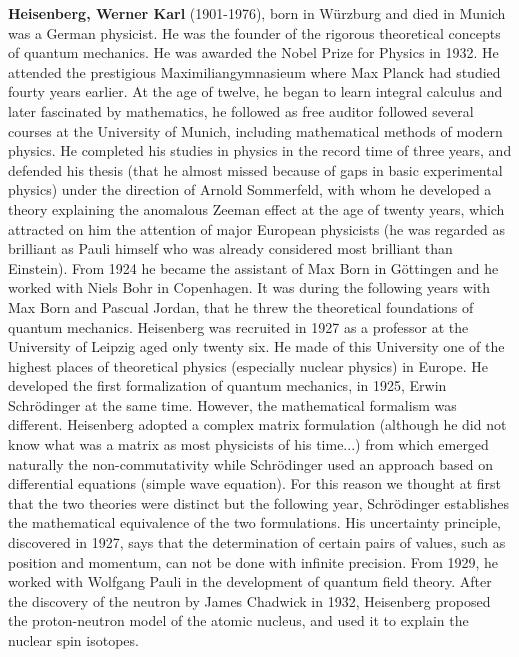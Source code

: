 \textbf{Heisenberg, Werner Karl} (1901-1976), born in Würzburg and died in Munich was a German physicist. He was the founder of the rigorous theoretical concepts of quantum mechanics. He was awarded the Nobel Prize for Physics in 1932. He attended the prestigious Maximiliangymnasieum where Max Planck had studied fourty years earlier. At the age of twelve, he began to learn integral calculus and later fascinated by mathematics, he followed as free auditor followed several courses at the University of Munich, including mathematical methods of modern physics. He completed his studies in physics in the record time of three years, and defended his thesis (that he almost missed because of gaps in basic experimental physics) under the direction of Arnold Sommerfeld, with whom he developed a theory explaining the anomalous Zeeman effect at the age of twenty years, which attracted on him the attention of major European physicists (he was regarded as brilliant as Pauli himself who was already considered most brilliant than Einstein). From 1924 he became the assistant of Max Born in Göttingen and he worked with Niels Bohr in Copenhagen. It was during the following years with Max Born and Pascual Jordan, that he threw the theoretical foundations of quantum mechanics. Heisenberg was recruited in 1927 as a professor at the University of Leipzig aged only twenty six. He made of this University one of the highest places of theoretical physics (especially nuclear physics) in Europe. He developed the first formalization of quantum mechanics, in 1925, Erwin Schrödinger at the same time. However, the mathematical formalism was different. Heisenberg adopted a complex matrix formulation (although he did not know what was a matrix as most physicists of his time...) from which emerged naturally the non-commutativity while Schrödinger used an approach based on differential equations (simple wave equation). For this reason we thought at first that the two theories were distinct but the following year, Schrödinger establishes the mathematical equivalence of the two formulations. His uncertainty principle, discovered in 1927, says that the determination of certain pairs of values, such as position and momentum, can not be done with infinite precision. From 1929, he worked with Wolfgang Pauli in the development of quantum field theory. After the discovery of the neutron by James Chadwick in 1932, Heisenberg proposed the proton-neutron model of the atomic nucleus, and used it to explain the nuclear spin isotopes.

